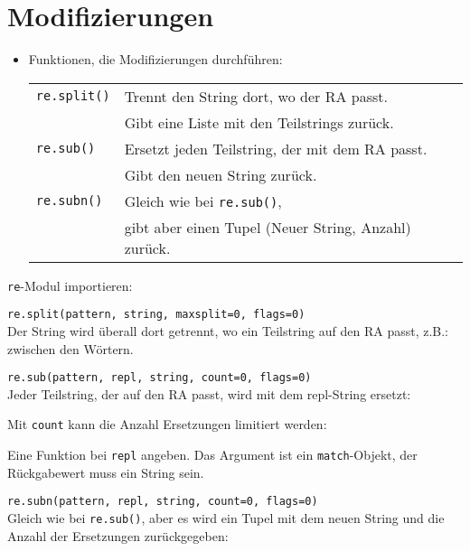 \section{Modifizierungen}
\begin{itemize}
	\item Funktionen, die Modifizierungen durchführen:\\
	\begin{tabular}{ll}
		\texttt{re.split()}& Trennt den String dort, wo der RA passt.\\
		& Gibt eine Liste mit den Teilstrings zurück.\\
		\texttt{re.sub()}& Ersetzt jeden Teilstring, der mit dem RA passt.\\
		& Gibt den neuen String zurück.\\
		\texttt{re.subn()}& Gleich wie bei \texttt{re.sub()},\\
		& gibt aber einen Tupel (Neuer String, Anzahl) zurück.\\
	\end{tabular}
\end{itemize}
\texttt{re}-Modul importieren:

\texttt{re.split(pattern, string, maxsplit=0, flags=0)}\\
Der String wird überall dort getrennt, wo ein Teilstring auf den RA passt, z.B.: zwischen den Wörtern.

\texttt{re.sub(pattern, repl, string, count=0, flags=0)}\\
Jeder Teilstring, der auf den RA passt, wird mit dem repl-String ersetzt:

Mit \texttt{count} kann die Anzahl Ersetzungen limitiert werden:

Eine Funktion bei \texttt{repl} angeben. Das Argument ist ein \texttt{match}-Objekt, der Rückgabewert muss ein String sein.

\texttt{re.subn(pattern, repl, string, count=0, flags=0)}\\
Gleich wie bei \texttt{re.sub()}, aber es wird ein Tupel mit dem neuen String und die Anzahl der Ersetzungen zurückgegeben:


